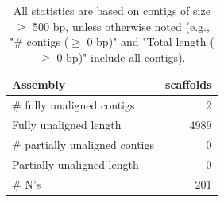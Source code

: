 \documentclass[12pt,a4paper]{article}
\begin{document}
\begin{table}[ht]
\begin{center}
\caption{All statistics are based on contigs of size $\geq$ 500 bp, unless otherwise noted (e.g., "\# contigs ($\geq$ 0 bp)" and "Total length ($\geq$ 0 bp)" include all contigs).}
\begin{tabular}{|l*{1}{|r}|}
\hline
Assembly & scaffolds \\ \hline
\# fully unaligned contigs & 2 \\ \hline
Fully unaligned length & 4989 \\ \hline
\# partially unaligned contigs & 0 \\ \hline
Partially unaligned length & 0 \\ \hline
\# N's & 201 \\ \hline
\end{tabular}
\end{center}
\end{table}
\end{document}
